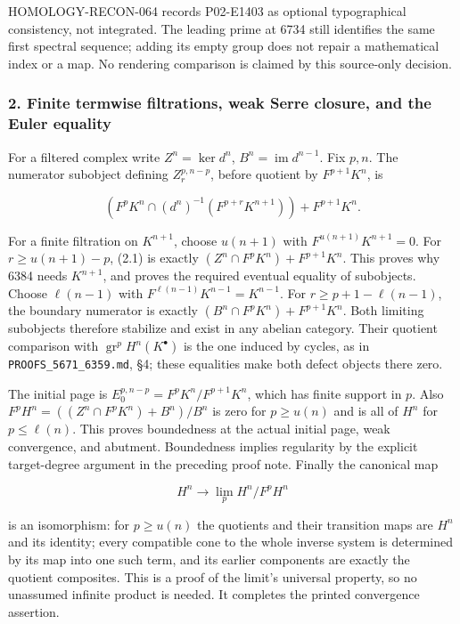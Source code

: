 \documentclass[11pt]{article}
\begin{document}
HOMOLOGY-RECON-064 records P02-E1403 as optional typographical consistency, not integrated. The leading prime at 6734 still identifies the same first spectral sequence; adding its empty group does not repair a mathematical index or a map. No rendering comparison is claimed by this source-only decision.

\subsubsection{2. Finite termwise filtrations, weak Serre closure, and the Euler equality}\label{finite-termwise-filtrations-weak-serre-closure-and-the-euler-equality}

For a filtered complex write \(Z^n=\ker d^n\), \(B^n=\operatorname{im}d^{n-1}\). Fix \(p,n\). The numerator subobject defining \(Z_r^{p,n-p}\), before quotient by \(F^{p+1}K^n\), is

\[
(F^pK^n\cap(d^n)^{-1}(F^{p+r}K^{n+1}))+F^{p+1}K^n. \tag{2.1}
\]

For a finite filtration on \(K^{n+1}\), choose \(u(n+1)\) with \(F^{u(n+1)}K^{n+1}=0\). For \(r\geq u(n+1)-p\), (2.1) is exactly \((Z^n\cap F^pK^n)+F^{p+1}K^n\). This proves why 6384 needs \(K^{n+1}\), and proves the required eventual equality of subobjects. Choose \(\ell(n-1)\) with \(F^{\ell(n-1)}K^{n-1}=K^{n-1}\). For \(r\geq p+1-\ell(n-1)\), the boundary numerator is exactly \((B^n\cap F^pK^n)+F^{p+1}K^n\). Both limiting subobjects therefore stabilize and exist in any abelian category. Their quotient comparison with \(\operatorname{gr}^pH^n(K^\bullet)\) is the one induced by cycles, as in \texttt{PROOFS\_5671\_6359.md}, §4; these equalities make both defect objects there zero.

The initial page is \(E_0^{p,n-p}=F^pK^n/F^{p+1}K^n\), which has finite support in \(p\). Also \(F^pH^n=((Z^n\cap F^pK^n)+B^n)/B^n\) is zero for \(p\geq u(n)\) and is all of \(H^n\) for \(p\leq\ell(n)\). This proves boundedness at the actual initial page, weak convergence, and abutment. Boundedness implies regularity by the explicit target-degree argument in the preceding proof note. Finally the canonical map

\[
H^n\longrightarrow\lim_p H^n/F^pH^n
\]

is an isomorphism: for \(p\geq u(n)\) the quotients and their transition maps are \(H^n\) and its identity; every compatible cone to the whole inverse system is determined by its map into one such term, and its earlier components are exactly the quotient composites. This is a proof of the limit's universal property, so no unassumed infinite product is needed. It completes the printed convergence assertion.
\end{document}
